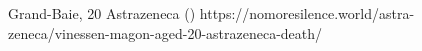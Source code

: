           {Grand-Baie, }
          {20}
          {Astrazeneca}
          {}
          {
             ()
          }
          {https://nomoresilence.world/astra-zeneca/vinessen-magon-aged-20-astrazeneca-death/}

